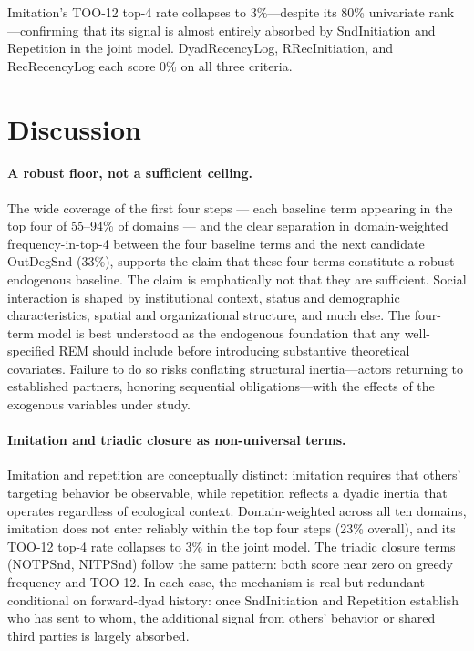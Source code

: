 \documentclass[11pt]{article}
\begin{document}
Imitation's TOO-12 top-4 rate collapses to 3\%---despite its 80\% univariate
rank---confirming that its signal is almost entirely absorbed by SndInitiation
and Repetition in the joint model. DyadRecencyLog, RRecInitiation, and
RecRecencyLog each score 0\% on all three criteria.




\section{Discussion}

\paragraph{A robust floor, not a sufficient ceiling.}
The wide coverage of the first four steps --- each baseline term appearing in
the top four of 55--94\% of domains --- and the clear separation in
domain-weighted frequency-in-top-4 between the four baseline terms and the
next candidate OutDegSnd (33\%), supports the claim that these four terms
constitute a robust endogenous baseline.
The claim is emphatically not that they are sufficient. Social interaction is
shaped by institutional context, status and demographic characteristics, spatial
and organizational structure, and much else. The four-term model is best
understood as the endogenous foundation that any well-specified REM should
include before introducing substantive theoretical covariates. Failure to do so
risks conflating structural inertia---actors returning to established partners,
honoring sequential obligations---with the effects of the exogenous variables
under study.

\paragraph{Imitation and triadic closure as non-universal terms.}
Imitation and repetition are conceptually distinct: imitation requires that
others' targeting behavior be observable, while repetition reflects a dyadic
inertia that operates regardless of ecological context. Domain-weighted across
all ten domains, imitation does not enter reliably within the top four steps
(23\% overall), and its TOO-12 top-4 rate collapses to 3\% in the joint model.
The triadic closure terms (NOTPSnd, NITPSnd) follow the same pattern: both score
near zero on greedy frequency and TOO-12. In each case, the mechanism is real
but redundant conditional on forward-dyad history: once SndInitiation and
Repetition establish who has sent to whom, the additional signal from others'
behavior or shared third parties is largely absorbed.
\end{document}

